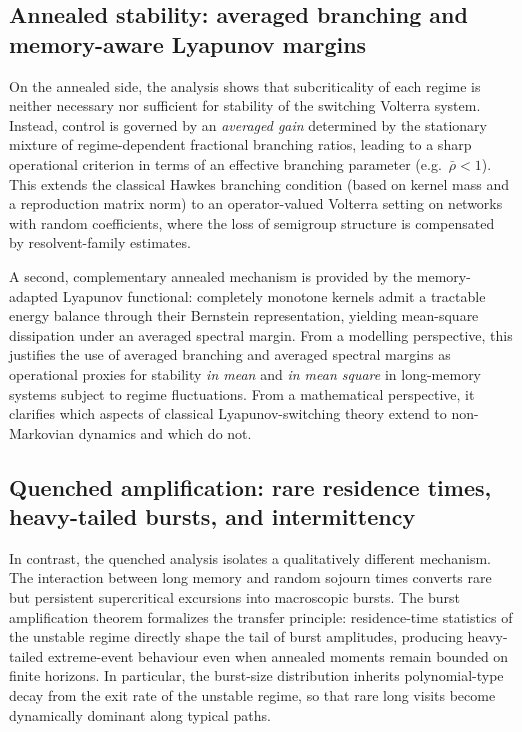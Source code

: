\documentclass[12pt,a4paper]{article}
\theoremstyle{plain}
\theoremstyle{definition}
\theoremstyle{remark}
\begin{document}
\subsection*{Annealed stability: averaged branching and memory-aware Lyapunov margins}

On the annealed side, the analysis shows that subcriticality of each regime is
neither necessary nor sufficient for stability of the switching Volterra system.
Instead, control is governed by an \emph{averaged gain} determined by the
stationary mixture of regime-dependent fractional branching ratios, leading to a
sharp operational criterion in terms of an effective branching parameter
(e.g.\ $\bar\rho<1$).
This extends the classical Hawkes branching condition (based on kernel mass and a
reproduction matrix norm) to an operator-valued Volterra setting on networks with
random coefficients, where the loss of semigroup structure is compensated by
resolvent-family estimates.

A second, complementary annealed mechanism is provided by the memory-adapted
Lyapunov functional: completely monotone kernels admit a tractable energy balance
through their Bernstein representation, yielding mean-square dissipation under an
averaged spectral margin.
From a modelling perspective, this justifies the use of averaged branching and
averaged spectral margins as operational proxies for stability \emph{in mean} and
\emph{in mean square} in long-memory systems subject to regime fluctuations.
From a mathematical perspective, it clarifies which aspects of classical
Lyapunov-switching theory extend to non-Markovian dynamics and which do not.

\subsection*{Quenched amplification: rare residence times, heavy-tailed bursts, and intermittency}

In contrast, the quenched analysis isolates a qualitatively different mechanism.
The interaction between long memory and random sojourn times converts rare but
persistent supercritical excursions into macroscopic bursts.
The burst amplification theorem formalizes the transfer principle:
residence-time statistics of the unstable regime directly shape the tail of burst
amplitudes, producing heavy-tailed extreme-event behaviour even when annealed
moments remain bounded on finite horizons.
In particular, the burst-size distribution inherits polynomial-type decay from
the exit rate of the unstable regime, so that rare long visits become dynamically
dominant along typical paths.
\end{document}
